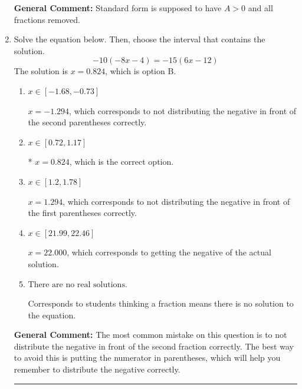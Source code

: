 \documentclass{extbook}[14pt]
\newcommand{\litem}[1]{\item #1

\rule{\textwidth}{0.4pt}}
\begin{document}
\begin{enumerate}
{\textbf{General Comment:} Standard form is supposed to have $A > 0$ and all fractions removed.
}
\litem{
Solve the equation below. Then, choose the interval that contains the solution.
\[ -10(-8x -4) = -15(6x -12) \]The solution is \( x = 0.824 \), which is option B.\begin{enumerate}[label=\Alph*.]
\item \( x \in [-1.68, -0.73] \)

$x = -1.294$, which corresponds to not distributing the negative in front of the second parentheses correctly.
\item \( x \in [0.72, 1.17] \)

* $x = 0.824$, which is the correct option.
\item \( x \in [1.2, 1.78] \)

$x = 1.294$, which corresponds to not distributing the negative in front of the first parentheses correctly.
\item \( x \in [21.99, 22.46] \)

$x = 22.000$, which corresponds to getting the negative of the actual solution.
\item \( \text{There are no real solutions.} \)

Corresponds to students thinking a fraction means there is no solution to the equation.
\end{enumerate}

\textbf{General Comment:} The most common mistake on this question is to not distribute the negative in front of the second fraction correctly. The best way to avoid this is putting the numerator in parentheses, which will help you remember to distribute the negative correctly.
}
\end{enumerate}
\end{document}
